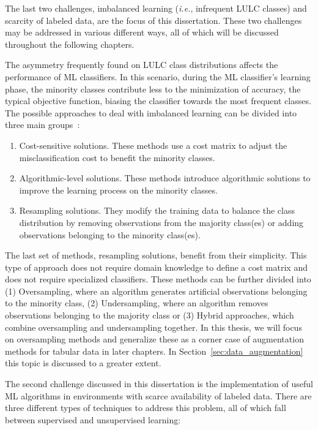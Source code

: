 The last two challenges, imbalanced learning (\textit{i.e.}, infrequent LULC
classes) and scarcity of labeled data, are the focus of this dissertation.
These two challenges may be addressed in various different ways, all of which
will be discussed throughout the following chapters.

The asymmetry frequently found on LULC class distributions affects the
performance of ML classifiers. In this scenario, during the ML classifier's
learning phase, the minority classes contribute less to the minimization of
accuracy, the typical objective function, biasing the classifier towards the
most frequent classes. The possible approaches to deal with imbalanced
learning can be divided into three main groups~\cite{Fernandez2013}: 

\begin{enumerate}
    \item Cost-sensitive solutions. These methods use a cost matrix to adjust
        the misclassification cost to benefit the minority classes.
    \item Algorithmic-level solutions. These methods introduce algorithmic
        solutions to improve the learning process on the minority classes. 
    \item Resampling solutions. They modify the training data to balance the
        class distribution by removing observations from the majority
        class(es) or adding observations belonging to the minority class(es).
\end{enumerate}

The last set of methods, resampling solutions, benefit from their
simplicity. This type of approach does not require domain knowledge to define
a cost matrix and does not require specialized classifiers. These methods
can be further divided into (1) Oversampling, where an algorithm generates
artificial observations belonging to the minority class, (2) Undersampling,
where an algorithm removes observations belonging to the majority class or (3)
Hybrid approaches, which combine oversampling and undersampling together. In
this thesis, we will focus on oversampling methods and generalize these as a
corner case of augmentation methods for tabular data in later chapters. In
Section~\ref{sec:data_augmentation} this topic is discussed to a greater
extent.

The second challenge discussed in this dissertation is the implementation of
useful ML algorithms in environments with scarce availability of labeled data.
There are three different types of techniques to address this problem, all of
which fall between supervised and unsupervised learning:

